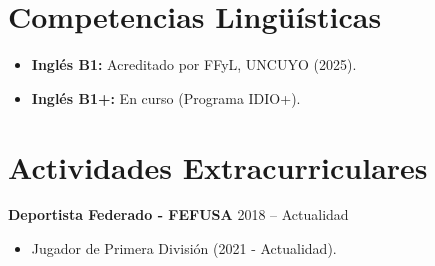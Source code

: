 \documentclass[11pt,a4paper]{article}
\begin{document}
\section*{Competencias Lingüísticas}
\begin{itemize}
    \item \textbf{Inglés B1:} Acreditado por FFyL, UNCUYO (2025).
    \item \textbf{Inglés B1+:} En curso (Programa IDIO+).
\end{itemize}

\section*{Actividades Extracurriculares}
\textbf{Deportista Federado - FEFUSA} \hfill 2018 -- Actualidad
\begin{itemize}
    \item Jugador de Primera División (2021 - Actualidad).
\end{itemize}
\end{document}
